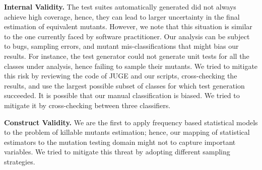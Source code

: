 \documentclass[sigconf,review,anonymous]{acmart}
\begin{document}
\noindent\textbf{Internal Validity.}
The test suites automatically generated did not always achieve high coverage, 
hence, they can lead to larger uncertainty in the final estimation of equivalent mutants. 
However, we note that this situation is similar to the one currently faced by software practitioner. %
%
Our analysis can be subject to bugs, sampling errors, and mutant mis-classifications
that might bias our results.
%
For instance, the test generator could not generate unit tests for all the classes under analysis,
hence failing to sample their mutants.
We tried to mitigate this risk by reviewing the code of JUGE and our scripts, 
cross-checking the results, and use the largest possible subset of classes for which
test generation succeeded.
It is possible that our manual classification is biased. We tried to mitigate it by cross-checking between three classifiers.

\noindent\textbf{Construct Validity.} We are the first to apply
frequency based statistical models %
to the problem of killable mutants estimation; hence, 
our mapping of statistical estimators to the mutation testing domain
might not to capture important variables. %
%
We tried to mitigate this threat by adopting different sampling strategies.
%
\end{document}
